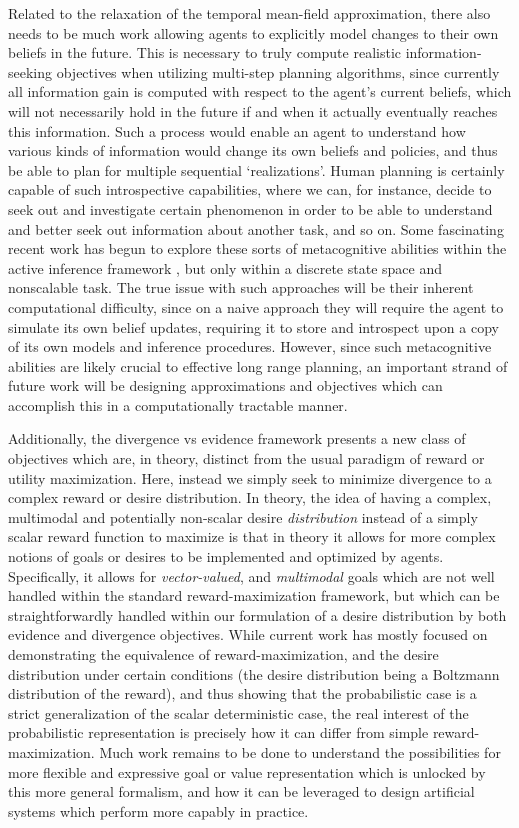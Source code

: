 Related to the relaxation of the temporal mean-field approximation, there also needs to be much work allowing agents to explicitly model changes to their own beliefs in the future. This is necessary to truly compute realistic information-seeking objectives when utilizing multi-step planning algorithms, since currently all information gain is computed with respect to the agent's current beliefs, which will not necessarily hold in the future if and when it actually eventually reaches this information. Such a process would enable an agent to understand how various kinds of information would change its own beliefs and policies, and thus be able to plan for multiple sequential `realizations'. Human planning is certainly capable of such introspective capabilities, where we can, for instance, decide to seek out and investigate certain phenomenon in order to be able to understand and better seek out information about another task, and so on. Some fascinating recent work has begun to explore these sorts of metacognitive abilities within the active inference framework \citep{friston2020sophisticated}, but only within a discrete state space and nonscalable task. The true issue with such approaches will be their inherent computational difficulty, since on a naive approach they will require the agent to simulate its own belief updates, requiring it to store and introspect upon a copy of its own models and inference procedures. However, since such metacognitive abilities are likely crucial to effective long range planning, an important strand of future work will be designing approximations and objectives which can accomplish this in a computationally tractable manner.

Additionally, the divergence vs evidence framework presents a new class of objectives which are, in theory, distinct from the usual paradigm of reward or utility maximization. Here, instead we simply seek to minimize divergence to a complex reward or desire distribution. In theory, the idea of having a complex, multimodal and potentially non-scalar desire \emph{distribution} instead of a simply scalar reward function to maximize is that in theory it allows for more complex notions of goals or desires to be implemented and optimized by agents. Specifically, it allows for \emph{vector-valued}, and \emph{multimodal} goals which are not well handled within the standard reward-maximization framework, but which can be straightforwardly handled within our formulation of a desire distribution by both evidence and divergence objectives. While current work has mostly focused on demonstrating the equivalence of reward-maximization, and the desire distribution under certain conditions (the desire distribution being a Boltzmann distribution of the reward), and thus showing that the probabilistic case is a strict generalization of the scalar deterministic case, the real interest of the probabilistic representation is precisely how it can differ from simple reward-maximization. Much work remains to be done to understand the possibilities for more flexible and expressive goal or value representation which is unlocked by this more general formalism, and how it can be leveraged to design artificial systems which perform more capably in practice.

